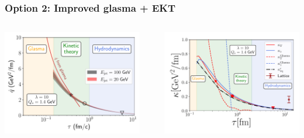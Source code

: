 \documentclass[aspectratio=169,11pt,usenames,dvipsnames]{beamer}
\begin{document}

\begin{frame}
    \frametitle{{\normalsize\color{jyured}\bfseries\sffamily Option 2: }Improved glasma + EKT}
    \vspace{-5pt}
    \begin{center}
        \begin{columns}
            \begin{center}\includegraphics[width=0.8\columnwidth]{images/2023-03-07-16-41-35_qhat_appetizer_glasma_comparison_493.pdf}\end{center}
                \\[10pt]
                \begin{center}\includegraphics[width=0.84\columnwidth]{images/KappaGlasmaVsEKTvsLatticev2.pdf}\end{center}

\end{columns}
\end{center}
\end{frame}
\end{document}
